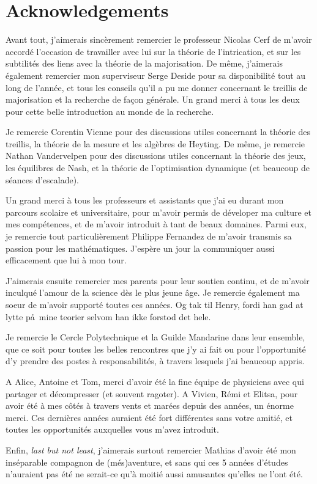 \section*{Acknowledgements}

Avant tout, j'aimerais sincèrement remercier le professeur Nicolas Cerf de m'avoir accordé l'occasion de travailler avec lui sur la théorie de l'intrication, et sur les subtilités des liens avec la théorie de la majorisation. De même, j'aimerais également remercier mon superviseur Serge Deside pour sa disponibilité tout au long de l'année, et tous les conseils qu'il a pu me donner concernant le treillis de majorisation et la recherche de façon générale. Un grand merci à tous les deux pour cette belle introduction au monde de la recherche. 

Je remercie Corentin Vienne pour des discussions utiles concernant la théorie des treillis, la théorie de la mesure et les algèbres de Heyting. De même, je remercie Nathan Vandervelpen pour des discussions utiles concernant la théorie des jeux, les équilibres de Nash, et la théorie de l'optimisation dynamique (et beaucoup de séances d'escalade).

Un grand merci à tous les professeurs et assistants que j'ai eu durant mon parcours scolaire et universitaire, pour m'avoir permis de déveloper ma culture et mes compétences, et de m'avoir introduit à tant de beaux domaines. Parmi eux, je remercie tout particulièrement Philippe Fernandez de m'avoir transmis sa passion pour les mathématiques. J'espère un jour la communiquer aussi efficacement que lui à mon tour.

J'aimerais ensuite remercier mes parents pour leur soutien continu, et de m'avoir inculqué l'amour de la science dès le plus jeune âge. Je remercie également ma soeur de m'avoir supporté toutes ces années. Og tak til Henry, fordi han gad at lytte p\aa \, mine teorier selvom han ikke forstod det hele.

Je remercie le Cercle Polytechnique et la Guilde Mandarine dans leur ensemble, que ce soit pour toutes les belles rencontres que j'y ai fait ou pour l'opportunité d'y prendre des postes à responsabilités, à travers lesquels j'ai beaucoup appris.

A Alice, Antoine et Tom, merci d'avoir été la fine équipe de physiciens avec qui partager et décompresser (et souvent ragoter). A Vivien, Rémi et Elitsa, pour avoir été à mes côtés à travers vents et marées depuis des années, un énorme merci. Ces dernières années auraient été fort différentes sans votre amitié, et toutes les opportunités auxquelles vous m'avez introduit.

Enfin, \textit{last but not least}, j'aimerais surtout remercier Mathias d'avoir été mon inséparable compagnon de (més)aventure, et sans qui ces 5 années d'études n'auraient pas été ne serait-ce qu'à moitié aussi amusantes qu'elles ne l'ont été.

